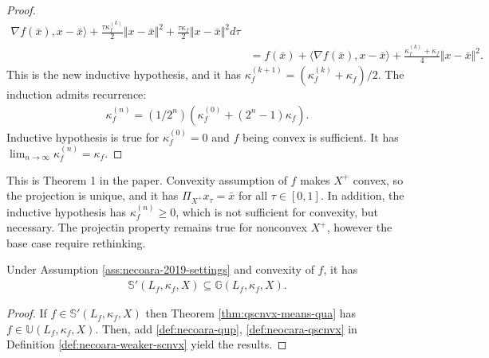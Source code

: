 \documentclass[12pt]{report}
\begin{document}
\begin{proof}
{\begin{align*}
                            \nabla f(\bar x), x - \bar x
                        \rangle
                        + \frac{\tau\kappa_f^{(k)}}{2} \Vert x - \bar x\Vert^2
                        + \frac{\tau\kappa_f}{2}\Vert x - \bar x\Vert^2
                    d\tau
                    \\
                    &= 
                    f(\bar x) + 
                    \langle 
                        \nabla f(\bar x), x - \bar x
                    \rangle
                    +
                    \frac{\kappa^{(k)}_f + \kappa_f}{4}
                    \Vert x - \bar x\Vert^2. 
                \end{align*}
                }
                This is the new inductive hypothesis, and it has $\kappa_f^{(k + 1)} = (\kappa_f^{(k)} + \kappa_f)/2$. 
                The induction admits recurrence: 
                \begin{align*}
                    \kappa_f^{(n)} = (1/2^n)(\kappa_f^{(0)} + (2^n - 1)\kappa_f). 
                \end{align*}
                Inductive hypothesis is true for $\kappa_f^{(0)} = 0$ and $f$ being convex is sufficient. 
                It has $\lim_{n\rightarrow \infty} \kappa_f^{(n)} = \kappa_f$. 
            \end{proof}
            \begin{remark}
                This is Theorem 1 in the paper. 
                Convexity assumption of $f$ makes $X^+$ convex, so the projection is unique, and it has $\Pi_{X^+}x_\tau = \bar x$ for all $\tau \in [0, 1]$. 
                In addition, the inductive hypothesis has $\kappa_f^{(n)} \ge 0$, which is not sufficient for convexity, but necessary. 
                The projectin property remains true for nonconvex $X^+$, however the base case require rethinking. 
            \end{remark}
            \begin{theorem}
                Under Assumption \ref{ass:necoara-2019-settings} and convexity of $f$, it has 
                \begin{align*}
                    \mathbb S'(L_f, \kappa_f, X) \subseteq \mathbb G(L_f, \kappa_f, X). 
                \end{align*}
            \end{theorem}
            \begin{proof}
                If $f \in \mathbb S'(L_f, \kappa_f, X)$ then Theorem \ref{thm:qscnvx-means-qua} has $f \in \mathbb U(L_f, \kappa_f, X)$. 
                Then, add \ref{def:necoara-qup}, \ref{def:neocara-qscnvx} in Definition \ref{def:necoara-weaker-scnvx} yield the results. 
            \end{proof}
\end{document}
